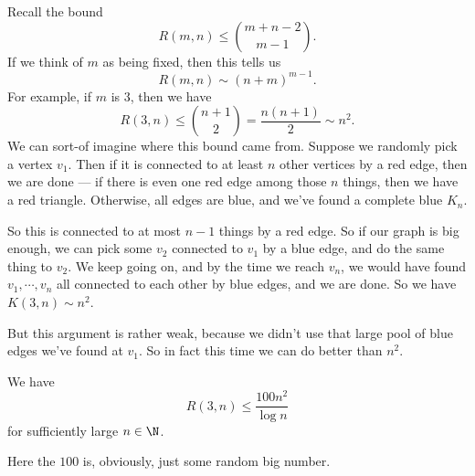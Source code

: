\documentclass[a4paper]{article}
\begin{document}
Recall the bound
\[
  R(m, n) \leq \binom{m + n - 2}{m - 1}.
\]
If we think of $m$ as being fixed, then this tells us
\[
  R(m, n) \sim (n + m)^{m - 1}.
\]
For example, if $m$ is $3$, then we have
\[
  R(3, n) \leq \binom{n + 1}{2} = \frac{n(n + 1)}{2} \sim n^2.
\]
We can sort-of imagine where this bound came from. Suppose we randomly pick a vertex $v_1$. Then if it is connected to at least $n$ other vertices by a red edge, then we are done --- if there is even one red edge among those $n$ things, then we have a red triangle. Otherwise, all edges are blue, and we've found a complete blue $K_n$.

So this is connected to at most $n - 1$ things by a red edge. So if our graph is big enough, we can pick some $v_2$ connected to $v_1$ by a blue edge, and do the same thing to $v_2$. We keep going on, and by the time we reach $v_n$, we would have found $v_1, \cdots, v_n$ all connected to each other by blue edges, and we are done. So we have $K(3, n) \sim n^2$.
\begin{center}
\end{center}
But this argument is rather weak, because we didn't use that large pool of blue edges we've found at $v_1$. So in fact this time we can do better than $n^2$.
\begin{thm}
  We have
  \[
    R(3, n) \leq \frac{100 n^2}{\log n}
  \]
  for sufficiently large $n \in \N$.
\end{thm}
Here the $100$ is, obviously, just some random big number.
\end{document}
